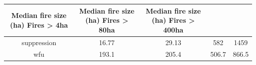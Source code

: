 \documentclass[twoside,12pt,final]{ucthesis-CA2012}
\begin{document}
\begin{ucmainmatter}
\begin{longtable}[]{@{}ccccc@{}}
\begin{minipage}[b]{0.19\columnwidth}
Median fire size (ha) Fires \textgreater{} 4ha\strut
\end{minipage} & \begin{minipage}[b]{0.19\columnwidth}\centering\strut
Median fire size (ha) Fires \textgreater{} 80ha\strut
\end{minipage} & \begin{minipage}[b]{0.19\columnwidth}\centering\strut
Median fire size (ha) Fires \textgreater{} 400ha\strut
\end{minipage}\tabularnewline
\midrule
\endhead
\begin{minipage}[t]{0.11\columnwidth}\centering\strut
suppression\strut
\end{minipage} & \begin{minipage}[t]{0.19\columnwidth}\centering\strut
16.77\strut
\end{minipage} & \begin{minipage}[t]{0.19\columnwidth}\centering\strut
29.13\strut
\end{minipage} & \begin{minipage}[t]{0.19\columnwidth}\centering\strut
582\strut
\end{minipage} & \begin{minipage}[t]{0.19\columnwidth}\centering\strut
1459\strut
\end{minipage}\tabularnewline
\begin{minipage}[t]{0.11\columnwidth}\centering\strut
wfu\strut
\end{minipage} & \begin{minipage}[t]{0.19\columnwidth}\centering\strut
193.1\strut
\end{minipage} & \begin{minipage}[t]{0.19\columnwidth}\centering\strut
205.4\strut
\end{minipage} & \begin{minipage}[t]{0.19\columnwidth}\centering\strut
506.7\strut
\end{minipage} & \begin{minipage}[t]{0.19\columnwidth}\centering\strut
866.5\strut
\end{minipage}\tabularnewline
\bottomrule
\end{longtable}
\begin{figure}
\centering

\end{figure}
\end{ucmainmatter}
\end{document}
